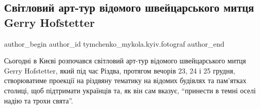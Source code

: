  
 
 
 
 
 
\subsection{Світловий арт-тур відомого швейцарського митця  Gerry Hofstetter}
\label{sec:23_12_2022.fb.tymchenko_mykola.kyiv.fotograf.1.svitlo_arttur}
 
\ifcmt
 author_begin
   author_id tymchenko_mykola.kyiv.fotograf
 author_end
\fi

Сьогодні в Києві розпочався світловий арт-тур відомого швейцарського митця
Gerry Hofstetter, який під час Різдва, протягом  вечорів 23, 24 і 25 грудня,
створюватиме проекції на різдвяну тематику на відомих будівлях та пам'ятках
столиці, щоб підтримати українців та, як він сам вказує, \enquote{принести в темні
оселі надію та трохи свята}.

